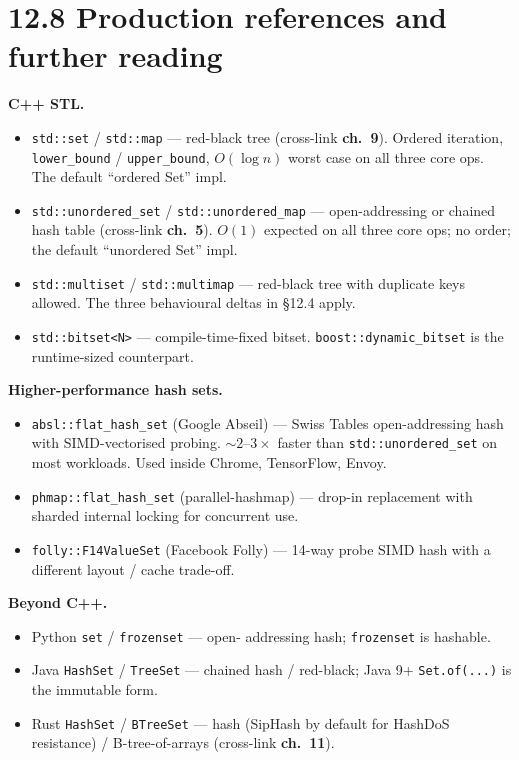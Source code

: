 \documentclass[11pt]{article}
\begin{document}
\section{12.8 Production references and further reading}

\begin{notebox}
\textbf{C++ STL.}
\begin{itemize}[leftmargin=*]
    \item \texttt{std::set} / \texttt{std::map} ---
          red-black tree (cross-link \textbf{ch.~9}). Ordered
          iteration, \texttt{lower\_bound} / \texttt{upper\_bound},
          $O(\log n)$ worst case on all three core ops. The
          default ``ordered Set'' impl.
    \item \texttt{std::unordered\_set} /
          \texttt{std::unordered\_map} --- open-addressing or
          chained hash table (cross-link \textbf{ch.~5}).
          $O(1)$ expected on all three core ops; no order; the
          default ``unordered Set'' impl.
    \item \texttt{std::multiset} / \texttt{std::multimap} ---
          red-black tree with duplicate keys allowed. The three
          behavioural deltas in \S12.4 apply.
    \item \texttt{std::bitset<N>} --- compile-time-fixed bitset.
          \texttt{boost::dynamic\_bitset} is the runtime-sized
          counterpart.
\end{itemize}

\textbf{Higher-performance hash sets.}
\begin{itemize}[leftmargin=*]
    \item \texttt{absl::flat\_hash\_set} (Google Abseil) ---
          Swiss Tables open-addressing hash with SIMD-vectorised
          probing. $\sim 2$--$3 \times$ faster than
          \texttt{std::unordered\_set} on most workloads. Used
          inside Chrome, TensorFlow, Envoy.
    \item \texttt{phmap::flat\_hash\_set} (parallel-hashmap) ---
          drop-in replacement with sharded internal locking
          for concurrent use.
    \item \texttt{folly::F14ValueSet} (Facebook Folly) --- 14-way
          probe SIMD hash with a different layout / cache trade-off.
\end{itemize}

\textbf{Beyond C++.}
\begin{itemize}[leftmargin=*]
    \item Python \texttt{set} / \texttt{frozenset} --- open-
          addressing hash; \texttt{frozenset} is hashable.
    \item Java \texttt{HashSet} / \texttt{TreeSet} ---
          chained hash / red-black; Java 9+ \texttt{Set.of(...)}
          is the immutable form.
    \item Rust \texttt{HashSet} / \texttt{BTreeSet} --- hash
          (SipHash by default for HashDoS resistance) /
          B-tree-of-arrays (cross-link \textbf{ch.~11}).
\end{itemize}


\end{notebox}
\end{document}
